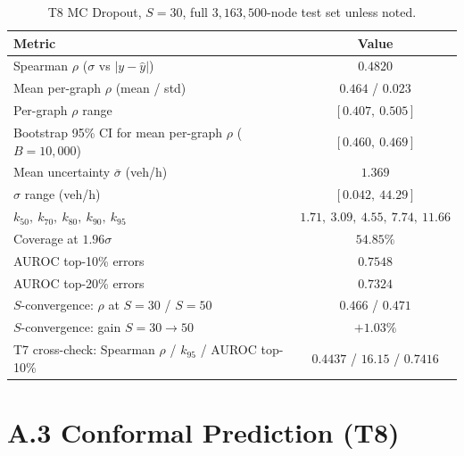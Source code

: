 \begin{table}[H]
\centering
\caption[Verified T8 MC Dropout UQ metrics]{T8 MC Dropout, $S = 30$, full $3{,}163{,}500$-node test set unless noted.}
\label{tab:app_t8mc}
\begin{tabular}{lc}
\toprule
Metric & Value \\
\midrule
Spearman $\rho$ ($\sigma$ vs $|y - \hat y|$) & $0.4820$ \\
Mean per-graph $\rho$ (mean / std) & $0.464$ / $0.023$ \\
Per-graph $\rho$ range & $[0.407,\ 0.505]$ \\
Bootstrap 95\% CI for mean per-graph $\rho$ ($B = 10{,}000$) & $[0.460,\ 0.469]$ \\
Mean uncertainty $\bar\sigma$ (veh/h) & $1.369$ \\
$\sigma$ range (veh/h) & $[0.042,\ 44.29]$ \\
$k_{50},\ k_{70},\ k_{80},\ k_{90},\ k_{95}$ & $1.71,\ 3.09,\ 4.55,\ 7.74,\ 11.66$ \\
Coverage at $1.96\sigma$ & $54.85\%$ \\
AUROC top-10\% errors & $0.7548$ \\
AUROC top-20\% errors & $0.7324$ \\
$S$-convergence: $\rho$ at $S = 30$ / $S = 50$ & $0.466$ / $0.471$ \\
$S$-convergence: gain $S = 30 \to 50$ & $+1.03\%$ \\
T7 cross-check: Spearman $\rho$ / $k_{95}$ / AUROC top-10\% & $0.4437$ / $16.15$ / $0.7416$ \\
\bottomrule
\end{tabular}
\end{table}

\section*{A.3 Conformal Prediction (T8)}\label{app:tab:conformal}

